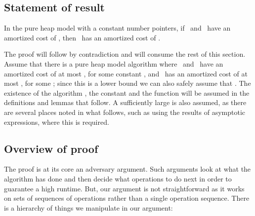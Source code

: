\subsection{Statement of result} 

\begin{theorem} 
In the pure heap model with a constant number  pointers, if\/ \opEm\ and \opIns\ have an amortized cost of , then \opDc\ has an amortized cost of .\end{theorem}

The proof will follow by contradiction and will consume the rest of this section. Assume that there is a pure heap model algorithm  where \opEm\ and \opIns\ have an amortized cost of at most , for some constant , and \opDc\ has an amortized cost of at most  , for some ; since this is a lower bound we can also safely assume that . 
The existence of the algorithm  ,  the constant  and the function  will be assumed in the definitions and lemmas that follow. A sufficiently large  is also assumed, as there are several places noted in what follows, such as using the results of asymptotic expressions, where this is required.

\subsection{Overview of proof}

The proof is at its core an adversary argument. Such arguments look at what the algorithm has done and then decide what operations to do next in order to guarantee a high runtime. But, our argument is not straightforward as it works on sets of sequences of operations rather than a single operation sequence. There is a hierarchy of things we manipulate in our argument:

\begin{fullonly}
\begin{description}
\end{fullonly}

